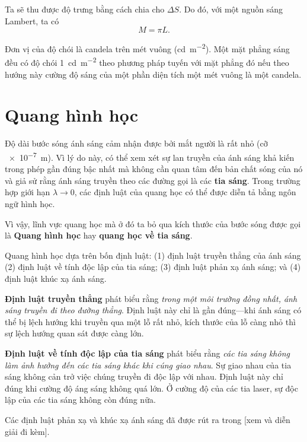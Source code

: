 \noindent
Ta sẽ thu được độ trưng bằng cách chia cho $\Delta{S}$.
Do đó, với một nguồn sáng Lambert, ta có
\begin{equation}\label{eq:16_50}
    M = \pi L.
\end{equation}

Đơn vị của độ chói là candela trên mét vuông (\si{\candela\per\metre\squared}).
Một mặt phẳng sáng đều có độ chói \SI{1}{\candela\per\metre\squared} theo phương pháp tuyến với mặt phẳng đó nếu theo hướng này cường độ sáng của một phần diện tích một mét vuông là một candela.

\section{Quang hình học}\label{sec:16_6}
\vspace{-12pt}
Độ dài bước sóng ánh sáng cảm nhận được bởi mắt người là rất nhỏ (cỡ \SI{e-7}{\metre}).
Vì lý do này, có thể xem xét sự lan truyền của ánh sáng khả kiến trong phép gần đúng bậc nhất mà không cần quan tâm đến bản chất sóng của nó và giả sử rằng ánh sáng truyền theo các đường gọi là các \textbf{tia sáng}.
Trong trường hợp giới hạn $\lambda\to 0$, các định luật của quang học có thể được diễn tả bằng ngôn ngữ hình học.

Vì vậy, lĩnh vực quang học mà ở đó ta bỏ qua kích thước của bước sóng được gọi là \textbf{Quang hình học} hay \textbf{quang học về tia sáng}.

Quang hình học dựa trên bốn định luật: (1) định luật truyền thẳng của ánh sáng (2) định luật về tính độc lập của tia sáng; (3) định luật phản xạ ánh sáng; và (4) định luật khúc xạ ánh sáng.

\textbf{Định luật truyền thẳng} phát biểu rằng \textit{trong một môi trường đồng nhất, ánh sáng truyền đi theo đường thẳng}.
Định luật này chỉ là gần đúng---khi ánh sáng có thể bị lệch hướng khi truyền qua một lỗ rất nhỏ, kích thước của lỗ càng nhỏ thì sự lệch hướng quan sát được càng lớn.

\textbf{Định luật về tính độc lập của tia sáng} phát biểu rằng \textit{các tia sáng không làm ảnh hưởng đến các tia sáng khác khi cúng giao nhau}.
Sự giao nhau của tia sáng không cản trở việc chúng truyền đi độc lập với nhau. Định luật này chỉ đúng khi cường độ áng sáng không quá lớn.
Ở cường độ của các tia laser, sự độc lập của các tia sáng không còn đúng nữa.

Các định luật phản xạ và khúc xạ ánh sáng đã được rút ra trong  [xem  và diễn giải đi kèm].


